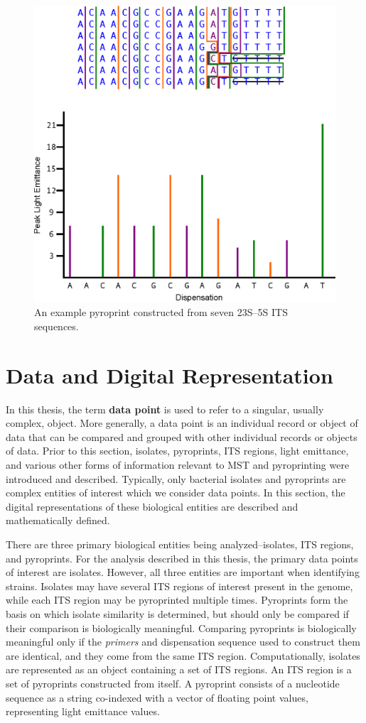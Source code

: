 \documentclass[12pt]{ucthesis}
\begin{document}
      \begin{figure}[t]
         \centering
         \includegraphics[width=0.70\columnwidth]{graphics/PyroprintExample.eps}
         \caption{An example pyroprint constructed from seven 23S--5S ITS
                  sequences.}
         \label{fig:pyroprint_example}
      \end{figure}

   \section{Data and Digital Representation}
      In this thesis, the term \textbf{data point} is used to refer to a
      singular, usually complex, object. More generally, a data point is an
      individual record or object of data that can be compared and grouped with
      other individual records or objects of data. Prior to this section,
      isolates, pyroprints, ITS regions, light emittance, and various other
      forms of information relevant to MST and pyroprinting were introduced and
      described. Typically, only bacterial isolates and pyroprints are complex
      entities of interest which we consider data points. In this section, the
      digital representations of these biological entities are described and
      mathematically defined.

      There are three primary biological entities being analyzed--isolates, ITS
      regions, and pyroprints. For the analysis described in this thesis, the
      primary data points of interest are isolates. However, all three entities
      are important when identifying strains. Isolates may have several ITS
      regions of interest present in the genome, while each ITS region may be
      pyroprinted multiple times. Pyroprints form the basis on which isolate
      similarity is determined, but should only be compared if their comparison
      is biologically meaningful. Comparing pyroprints is biologically
      meaningful only if the \textit{primers} and dispensation sequence used to
      construct them are identical, and they come from the same ITS region.
      Computationally, isolates are represented as an object containing a set
      of ITS regions. An ITS region is a set of pyroprints constructed from
      itself. A pyroprint consists of a nucleotide sequence as a string
      co-indexed with a vector of floating point values, representing light
      emittance values.
      
\end{document}

